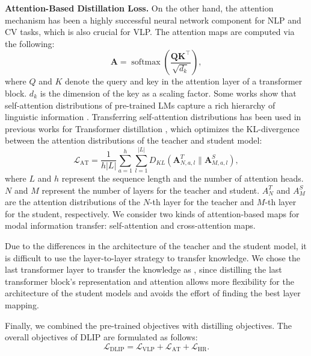 \documentclass[10pt,twocolumn,letterpaper]{article}
\begin{document}
\vspace{0.4em}
\par
\noindent
\textbf{Attention-Based Distillation Loss.}
On the other hand, the attention mechanism has been a highly successful neural network component for NLP and CV tasks, which is also crucial for VLP.
The attention maps are computed via the following:
\begin{equation}
    \mathbf{A}=\operatorname{softmax}\left(\frac{\mathbf{Q} \mathbf{K}^{\top}}{\sqrt{d_k}}\right),
\end{equation}
where $Q$ and $K$ denote the query and key in the attention layer of a transformer block. $d_k$ is the dimension of the key as a scaling factor. 
Some works show that self-attention distributions of pre-trained LMs capture a rich hierarchy of linguistic information \cite{devlin2018bert, liu2019roberta}.
Transferring self-attention distributions has been used in previous works for Transformer distillation \cite{wang2020minilm, yang2022vitkd},
which optimizes the KL-divergence between the attention distributions of the teacher and student model:
\begin{equation}\label{eq_at}
    \mathcal{L}_{\mathrm{AT}}=\frac{1}{h|L|} \sum_{a=1}^{h} \sum_{l=1}^{|L|} D_{K L}\left(\mathbf{A}_{N, a, l}^T \| \mathbf{A}_{M, a, l}^S\right),
\end{equation}
where $L$ and $h$ represent the sequence length and the number of attention heads. $N$ and $M$ represent the number of layers for the teacher and student. $A^T_N$ and $A^S_M$ are the attention distributions of the $N$-th layer for the teacher and $M$-th layer for the student, respectively. We consider two kinds of attention-based maps for modal information transfer: self-attention and cross-attention maps.

Due to the differences in the architecture of the teacher and the student model, it is difficult to use the layer-to-layer strategy to transfer knowledge.
We chose the last transformer layer to transfer the knowledge as  \cite{wang2020minilm,fang2021compressing}, since distilling the last transformer block’s representation and attention allows more flexibility for the architecture of the student models and avoids the effort of finding the best layer mapping. 

Finally, we combined the pre-trained objectives with distilling objectives.
The overall objectives of DLIP are formulated as follows:
\begin{equation}
\mathcal{L}_{\mathrm{DLIP}}=  \mathcal{L}_{\mathrm{VLP}} +\mathcal{L}_{\mathrm{AT}} + \mathcal{L}_{\mathrm{HR}}.
\end{equation}
\end{document}
